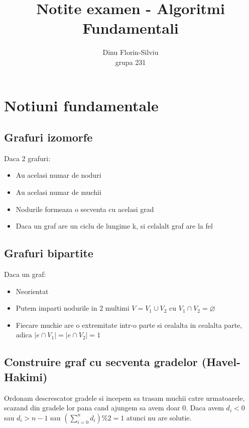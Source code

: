 \documentclass{article}
\title{Notite examen - Algoritmi Fundamentali}
\date{}
\author{Dinu Florin-Silviu \\ grupa 231}
\begin{document}
\maketitle
\tableofcontents

\newpage
{}

\section{Notiuni fundamentale}
\subsection*{Grafuri izomorfe} Daca 2 grafuri:
\begin{itemize}
    \item Au acelasi numar de noduri
    \item Au acelasi numar de muchii
    \item Nodurile formeaza o secventa cu acelasi grad
    \item Daca un graf are un ciclu de lungime k, si celalalt graf are la fel
\end{itemize}

\subsection*{Grafuri bipartite} Daca un graf:
\begin{itemize}
    \item Neorientat
    \item Putem imparti nodurile in 2 multimi $V=V_1 \cup V_2$ cu $V_1 \cap V_2 = \varnothing$
    \item Fiecare muchie are o extremitate intr-o parte si cealalta in cealalta parte, adica $|e \cap V_1| = |e \cap V_2| = 1$
\end{itemize}

\subsection*{Construire graf cu secventa gradelor (Havel-Hakimi)} Ordonam descrescator gradele si incepem sa trasam muchii catre urmatoarele, scazand din gradele lor pana cand ajungem sa avem doar 0. Daca avem $d_i<0$ sau $d_i>n-1$ sau $(\sum_{i=0}^{n} d_i) \% 2 = 1$ atunci nu are solutie.
\end{document}
